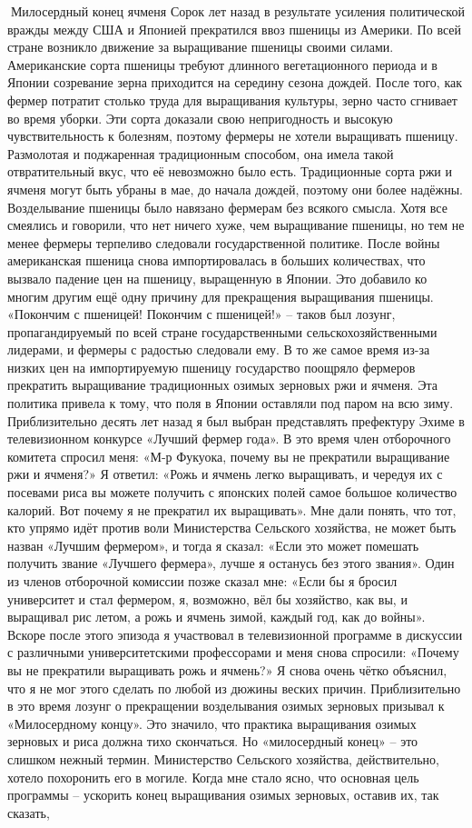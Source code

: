 \documentclass[a4paper]{book}
\begin{document}
Милосердный конец ячменя
Сорок лет назад в результате усиления политической вражды между США и Японией
прекратился ввоз пшеницы из Америки. По всей стране возникло движение за выращивание
пшеницы своими силами. Американские сорта пшеницы требуют длинного вегетационного
периода и в Японии созревание зерна приходится на середину сезона дождей. После того,
как фермер потратит столько труда для выращивания культуры, зерно часто сгнивает во
время уборки. Эти сорта доказали свою непригодность и высокую чувствительность к
болезням, поэтому фермеры не хотели выращивать пшеницу. Размолотая и поджаренная
традиционным способом, она имела такой отвратительный вкус, что её невозможно было
есть.
Традиционные сорта ржи и ячменя могут быть убраны в мае, до начала дождей, поэтому
они более надёжны. Возделывание пшеницы было навязано фермерам без всякого смысла.
Хотя все смеялись и говорили, что нет ничего хуже, чем выращивание пшеницы, но тем не
менее фермеры терпеливо следовали государственной политике.
После войны американская пшеница снова импортировалась в больших количествах,
что вызвало падение цен на пшеницу, выращенную в Японии. Это добавило ко многим
другим ещё одну причину для прекращения выращивания пшеницы. «Покончим с пшеницей!
Покончим с пшеницей!» – таков был лозунг, пропагандируемый по всей стране
государственными сельскохозяйственными лидерами, и фермеры с радостью следовали ему.
В то же самое время из-за низких цен на импортируемую пшеницу государство поощряло
фермеров прекратить выращивание традиционных озимых зерновых ржи и ячменя. Эта
политика привела к тому, что поля в Японии оставляли под паром на всю зиму.
Приблизительно десять лет назад я был выбран представлять префектуру Эхиме в
телевизионном конкурсе «Лучший фермер года». В это время член отборочного комитета
спросил меня: «М‑р Фукуока, почему вы не прекратили выращивание ржи и ячменя?»
Я ответил: «Рожь и ячмень легко выращивать, и чередуя их с посевами риса вы можете
получить с японских полей самое большое количество калорий. Вот почему я не прекратил
их выращивать».
Мне дали понять, что тот, кто упрямо идёт против воли Министерства Сельского
хозяйства, не может быть назван «Лучшим фермером», и тогда я сказал: «Если это может
помешать получить звание «Лучшего фермера», лучше я останусь без этого звания». Один из
членов отборочной комиссии позже сказал мне: «Если бы я бросил университет и стал
фермером, я, возможно, вёл бы хозяйство, как вы, и выращивал рис летом, а рожь и ячмень
зимой, каждый год, как до войны».
Вскоре после этого эпизода я участвовал в телевизионной программе в дискуссии с
различными университетскими профессорами и меня снова спросили: «Почему вы не
прекратили выращивать рожь и ячмень?» Я снова очень чётко объяснил, что я не мог этого
сделать по любой из дюжины веских причин. Приблизительно в это время лозунг о
прекращении возделывания озимых зерновых призывал к «Милосердному концу». Это
значило, что практика выращивания озимых зерновых и риса должна тихо скончаться. Но
«милосердный конец» – это слишком нежный термин. Министерство Сельского хозяйства,
действительно, хотело похоронить его в могиле. Когда мне стало ясно, что основная цель
программы – ускорить конец выращивания озимых зерновых, оставив их, так сказать,
\end{document}
